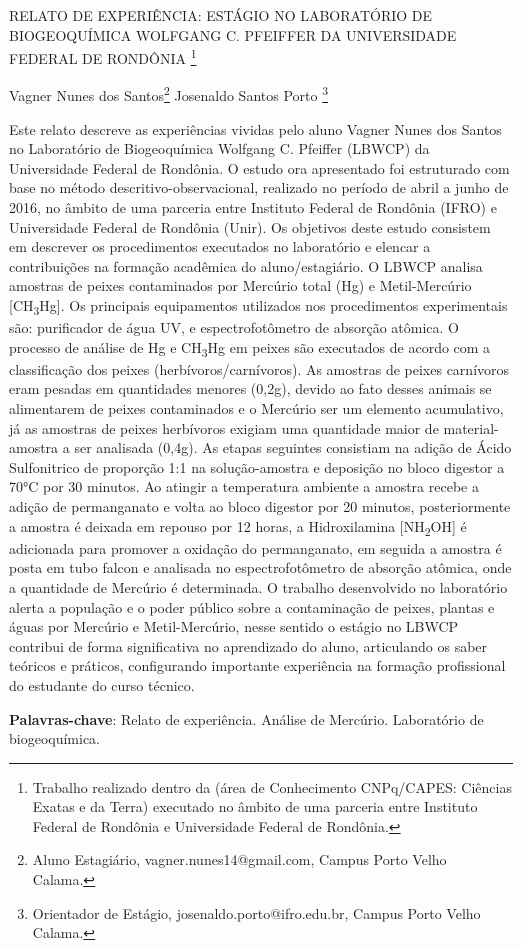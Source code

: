 \documentclass[article,12pt,onesidea,4paper,english,brazil]{abntex2}
\begin{document}
	
	
	\frenchspacing 
	
	\begin{center}
		\LARGE RELATO DE EXPERIÊNCIA: ESTÁGIO NO LABORATÓRIO DE BIOGEOQUÍMICA WOLFGANG C. PFEIFFER DA UNIVERSIDADE FEDERAL DE RONDÔNIA \footnote{Trabalho realizado dentro da (área de Conhecimento CNPq/CAPES: Ciências Exatas e da Terra) executado no âmbito de uma parceria entre Instituto Federal de Rondônia e Universidade Federal de Rondônia.}
		
		\normalsize
		Vagner Nunes dos Santos\footnote{Aluno Estagiário, vagner.nunes14@gmail.com, Campus Porto Velho Calama.} 
		Josenaldo Santos Porto \footnote{Orientador de Estágio, josenaldo.porto@ifro.edu.br, Campus Porto Velho Calama.} 
		 
	\end{center}
	
	\noindent 
	Este relato descreve as experiências vividas pelo aluno Vagner Nunes dos Santos no Laboratório de Biogeoquímica Wolfgang C. Pfeiffer (LBWCP) da Universidade Federal de Rondônia. O estudo ora apresentado foi estruturado com base no método descritivo-observacional, realizado no período de abril a junho de 2016, no âmbito de uma parceria entre Instituto Federal de Rondônia (IFRO) e Universidade Federal de Rondônia (Unir). Os objetivos deste estudo consistem em descrever os procedimentos executados no laboratório e elencar a contribuições na formação acadêmica do aluno/estagiário. O LBWCP analisa amostras de peixes contaminados por Mercúrio total (Hg) e Metil-Mercúrio [CH\textsubscript{3}Hg]. Os principais equipamentos utilizados nos procedimentos experimentais são: purificador de água UV, e espectrofotômetro de absorção atômica. O processo de análise de Hg e CH\textsubscript{3}Hg em peixes são executados de acordo com a classificação dos peixes (herbívoros/carnívoros). As amostras de peixes carnívoros eram pesadas em quantidades menores (0,2g), devido ao fato desses animais se alimentarem de peixes contaminados e o Mercúrio ser um elemento acumulativo, já as amostras de peixes herbívoros exigiam uma quantidade maior de material-amostra a ser analisada (0,4g).  As etapas seguintes consistiam na adição de Ácido Sulfonitrico de proporção 1:1 na solução-amostra e deposição no bloco digestor a 70°C por 30 minutos. Ao atingir a temperatura ambiente a amostra recebe a adição de permanganato e volta ao bloco digestor por 20 minutos, posteriormente a amostra é deixada em repouso por 12 horas, a Hidroxilamina [NH\textsubscript{2}OH] é adicionada para promover a oxidação do permanganato, em seguida a amostra é posta em tubo falcon e analisada no espectrofotômetro de absorção atômica, onde a quantidade de Mercúrio é determinada. O trabalho desenvolvido no laboratório alerta a população e o poder público sobre a contaminação de peixes, plantas e águas por Mercúrio e Metil-Mercúrio, nesse sentido o estágio no LBWCP contribui de forma significativa no aprendizado do aluno, articulando os saber teóricos e práticos, configurando importante experiência na formação profissional do estudante do curso técnico.
	
	\vspace{\onelineskip}
	
	\noindent
	\textbf{Palavras-chave}: Relato de experiência. Análise de Mercúrio. Laboratório de biogeoquímica.
	
\end{document}
